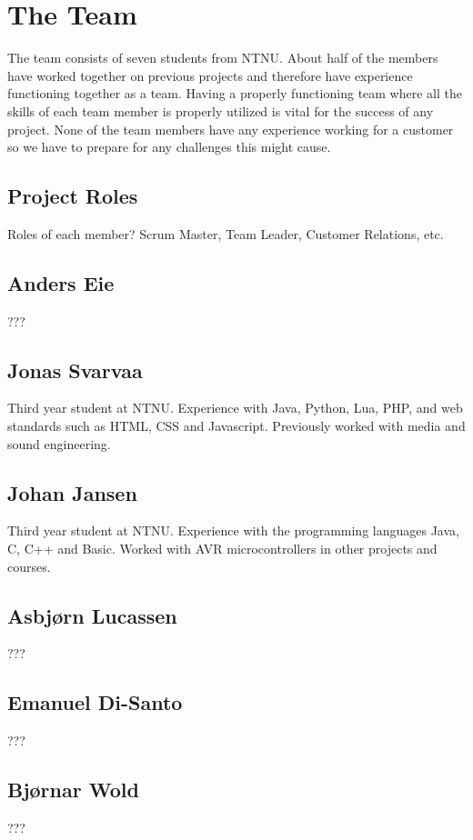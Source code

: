 \section{The Team}
The team consists of seven students from NTNU. About half of the members have worked
together on previous projects and therefore have experience functioning together as a
team. Having a properly functioning team where all the skills of each team member is properly
utilized is vital for the success of any project. None of the team members have any experience 
working for a customer so we have to prepare for any challenges this might cause.


\subsection{Project Roles}
Roles of each member? Scrum Master, Team Leader, Customer Relations, etc.

\subsection{Anders Eie}
???

\subsection{Jonas Svarvaa}
Third year student at NTNU. Experience with Java, Python, Lua, PHP, and web standards such as HTML, CSS and Javascript. Previously worked with media and sound engineering.

\subsection{Johan Jansen} 
Third year student at NTNU. Experience with the programming languages Java, C, C++  and 
Basic. Worked with AVR microcontrollers in other projects and courses.

\subsection{Asbjørn Lucassen}
???

\subsection{Emanuel Di-Santo}
???

\subsection{Bjørnar Wold}
???

